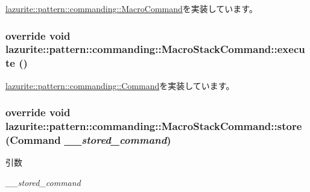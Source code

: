 \hyperlink{classlazurite_1_1pattern_1_1commanding_1_1_macro_command_a1ea80d83082f79545609f0c73bda0b7a}{lazurite::pattern::commanding::MacroCommand}を実装しています。\hypertarget{classlazurite_1_1pattern_1_1commanding_1_1_macro_stack_command_a9a5a088254429cfb113761f06d09fc9f}{
\subsubsection[{execute}]{\setlength{\rightskip}{0pt plus 5cm}override void lazurite::pattern::commanding::MacroStackCommand::execute ()}}
\label{classlazurite_1_1pattern_1_1commanding_1_1_macro_stack_command_a9a5a088254429cfb113761f06d09fc9f}


\hyperlink{classlazurite_1_1pattern_1_1commanding_1_1_command_afd9750cf772a6a65b1a1e11d8313fe03}{lazurite::pattern::commanding::Command}を実装しています。\hypertarget{classlazurite_1_1pattern_1_1commanding_1_1_macro_stack_command_ab18bb77c4756070bdac98a633d80921c}{
\subsubsection[{store}]{\setlength{\rightskip}{0pt plus 5cm}override void lazurite::pattern::commanding::MacroStackCommand::store ({\bf Command} {\em \_\-\_\-stored\_\-command})}}
\label{classlazurite_1_1pattern_1_1commanding_1_1_macro_stack_command_ab18bb77c4756070bdac98a633d80921c}

\begin{DoxyParams}{引数}
\item[{\em \_\-\_\-stored\_\-command}]\end{DoxyParams}


